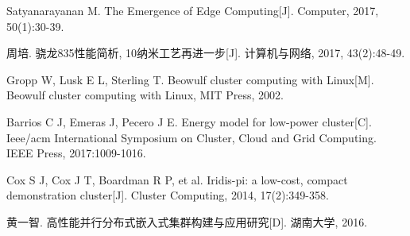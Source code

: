 \documentclass[a4paper,12pt]{report}
\begin{document}

\begin{thebibliography}{99}
\songti {} 
Satyanarayanan M. The Emergence of Edge Computing[J]. Computer, 2017, 50(1):30-39.

周培. 骁龙835性能简析, 10纳米工艺再进一步[J]. 计算机与网络, 2017, 43(2):48-49.

Gropp W, Lusk E L, Sterling T. Beowulf cluster computing with Linux[M]. Beowulf cluster computing with Linux, MIT Press, 2002.

Barrios C J, Emeras J, Pecero J E. Energy model for low-power cluster[C].  Ieee/acm International Symposium on Cluster, Cloud and Grid Computing. IEEE Press, 2017:1009-1016.

Cox S J, Cox J T, Boardman R P, et al. Iridis-pi: a low-cost, compact demonstration cluster[J]. Cluster Computing, 2014, 17(2):349-358.

黄一智. 高性能并行分布式嵌入式集群构建与应用研究[D]. 湖南大学, 2016.

\end{thebibliography}

\lstset{breaklines}                %
\lstset{extendedchars=false}
\lstset{language=Matlab}

\renewcommand{\thechapter}{附录\Alph{chapter}.} 
\appendix
\begin{appendix}
\begin{spacing}{1.5}

\end{spacing}
\end{appendix}
		
\end{document}

